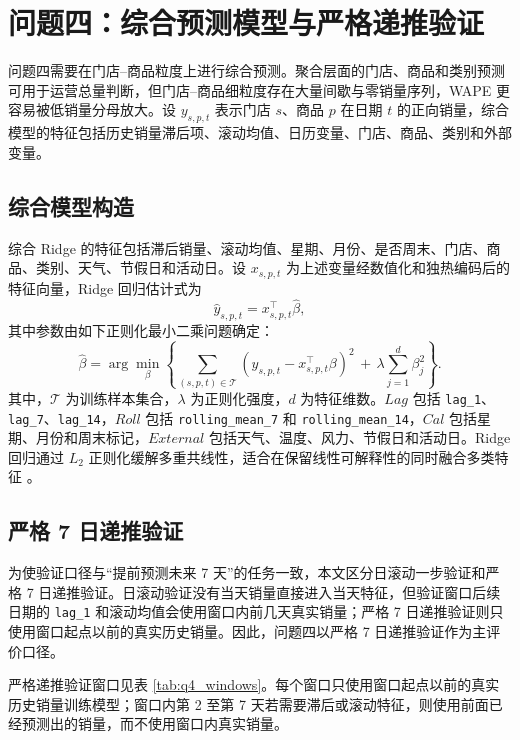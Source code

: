 \section{问题四：综合预测模型与严格递推验证}

问题四需要在门店--商品粒度上进行综合预测。聚合层面的门店、商品和类别预测可用于运营总量判断，但门店--商品细粒度存在大量间歇与零销量序列，WAPE 更容易被低销量分母放大。设 $y_{s,p,t}$ 表示门店 $s$、商品 $p$ 在日期 $t$ 的正向销量，综合模型的特征包括历史销量滞后项、滚动均值、日历变量、门店、商品、类别和外部变量。

\subsection{综合模型构造}

综合 Ridge 的特征包括滞后销量、滚动均值、星期、月份、是否周末、门店、商品、类别、天气、节假日和活动日。设 $x_{s,p,t}$ 为上述变量经数值化和独热编码后的特征向量，Ridge 回归估计式为
\begin{equation}
\hat y_{s,p,t}=x_{s,p,t}^{\top}\hat\beta,
\end{equation}
其中参数由如下正则化最小二乘问题确定：
\begin{equation}
\hat\beta=\arg\min_{\beta}\left\{\sum_{(s,p,t)\in \mathcal T}
\left(y_{s,p,t}-x_{s,p,t}^{\top}\beta\right)^2
\,+\,\lambda\sum_{j=1}^{d}\beta_j^2\right\}.
\end{equation}
其中，$\mathcal T$ 为训练样本集合，$\lambda$ 为正则化强度，$d$ 为特征维数。$Lag$ 包括 \texttt{lag\_1}、\texttt{lag\_7}、\texttt{lag\_14}，$Roll$ 包括 \texttt{rolling\_mean\_7} 和 \texttt{rolling\_mean\_14}，$Cal$ 包括星期、月份和周末标记，$External$ 包括天气、温度、风力、节假日和活动日。Ridge 回归通过 $L_2$ 正则化缓解多重共线性，适合在保留线性可解释性的同时融合多类特征 \cite{hoerl1970ridge}。

\subsection{严格 7 日递推验证}

为使验证口径与“提前预测未来 7 天”的任务一致，本文区分日滚动一步验证和严格 7 日递推验证。日滚动验证没有当天销量直接进入当天特征，但验证窗口后续日期的 \texttt{lag\_1} 和滚动均值会使用窗口内前几天真实销量；严格 7 日递推验证则只使用窗口起点以前的真实历史销量。因此，问题四以严格 7 日递推验证作为主评价口径。

严格递推验证窗口见表 \ref{tab:q4_windows}。每个窗口只使用窗口起点以前的真实历史销量训练模型；窗口内第 2 至第 7 天若需要滞后或滚动特征，则使用前面已经预测出的销量，而不使用窗口内真实销量。

